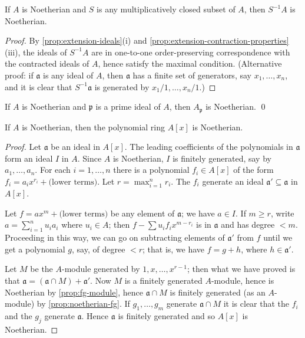 \begin{proposition}\label{prop:localization-noetherian}
If $A$ is Noetherian and $S$ is any multiplicatively closed subset of $A$, then $S^{-1}A$ is Noetherian.
\end{proposition}

    \begin{proof}
    By \eqref{prop:extension-ideals}(i) and \eqref{prop:extension-contraction-properties}(iii), the ideals of $S^{-1}A$ are in one-to-one order-preserving correspondence with the contracted ideals of $A$, hence satisfy the maximal condition. (Alternative proof: if $\mathfrak{a}$ is any ideal of $A$, then $\mathfrak{a}$ has a finite set of generators, say $x_1, \ldots, x_n$, and it is clear that $S^{-1}\mathfrak{a}$ is generated by $x_1/1, \ldots, x_n/1$.)
\end{proof}

\begin{corollary}\label{cor:local-ring-noetherian}
    If $A$ is Noetherian and $\mathfrak{p}$ is a prime ideal of $A$, then $A_{\mathfrak{p}}$ is Noetherian. \qed
\end{corollary}

\begin{theorem}\label{thm:hilbert-basis}
    If $A$ is Noetherian, then the polynomial ring $A[x]$ is Noetherian.
\end{theorem}

\begin{proof}
Let $\mathfrak{a}$ be an ideal in $A[x]$. The leading coefficients of the polynomials in $\mathfrak{a}$ form an ideal $I$ in $A$. Since $A$ is Noetherian, $I$ is finitely generated, say by $a_1, \ldots, a_n$. For each $i = 1, \ldots, n$ there is a polynomial $f_i \in A[x]$ of the form $f_i = a_i x^{r_i} + \text{(lower terms)}$. Let $r = \max_{i=1}^n r_i$. The $f_i$ generate an ideal $\mathfrak{a}' \subseteq \mathfrak{a}$ in $A[x]$.

Let $f = ax^m + \text{(lower terms)}$ be any element of $\mathfrak{a}$; we have $a \in I$. If $m \geq r$, write $a = \sum_{i=1}^n u_i a_i$ where $u_i \in A$; then $f - \sum u_i f_i x^{m-r_i}$ is in $\mathfrak{a}$ and has degree $< m$. Proceeding in this way, we can go on subtracting elements of $\mathfrak{a}'$ from $f$ until we get a polynomial $g$, say, of degree $< r$; that is, we have $f = g + h$, where $h \in \mathfrak{a}'$.

Let $M$ be the $A$-module generated by $1, x, \ldots, x^{r-1}$; then what we have proved is that $\mathfrak{a} = (\mathfrak{a} \cap M) + \mathfrak{a}'$. Now $M$ is a finitely generated $A$-module, hence is Noetherian by \eqref{prop:fg-module}, hence $\mathfrak{a} \cap M$ is finitely generated (as an $A$-module) by \eqref{prop:noetherian-fg}. If $g_1, \ldots, g_m$ generate $\mathfrak{a} \cap M$ it is clear that the $f_i$ and the $g_j$ generate $\mathfrak{a}$. Hence $\mathfrak{a}$ is finitely generated and so $A[x]$ is Noetherian.
\end{proof}

